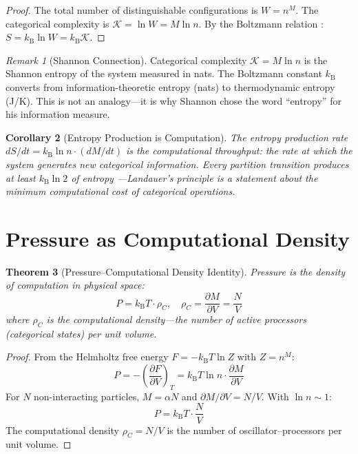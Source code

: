 \documentclass[twocolumn,10pt,a4paper]{article}
\theoremstyle{plain}
\newtheorem{theorem}{Theorem}[section]
\newtheorem{corollary}[theorem]{Corollary}
\theoremstyle{definition}
\theoremstyle{remark}
\newtheorem{remark}[theorem]{Remark}
\newcommand{\kB}{k_{\mathrm{B}}}
\begin{document}
\begin{proof}
The total number of distinguishable configurations is $W = n^M$. The categorical complexity is $\mathcal{K} = \ln W = M \ln n$. By the Boltzmann relation \cite{boltzmann1877}: $S = \kB \ln W = \kB \mathcal{K}$.
\end{proof}

\begin{remark}[Shannon Connection]
Categorical complexity $\mathcal{K} = M \ln n$ is the Shannon entropy \cite{shannon1948} of the system measured in nats. The Boltzmann constant $\kB$ converts from information-theoretic entropy (nats) to thermodynamic entropy (J/K). This is not an analogy---it is why Shannon chose the word ``entropy'' for his information measure.
\end{remark}

\begin{corollary}[Entropy Production is Computation]
The entropy production rate $dS/dt = \kB \ln n \cdot (dM/dt)$ is the computational throughput: the rate at which the system generates new categorical information. Every partition transition produces at least $\kB \ln 2$ of entropy \cite{landauer1961}---Landauer's principle is a statement about the minimum computational cost of categorical operations.
\end{corollary}

\section{Pressure as Computational Density}
\label{sec:pressure_density}

\begin{theorem}[Pressure--Computational Density Identity]
\label{thm:pressure_density}
Pressure is the density of computation in physical space:
\begin{equation}
\boxed{P = \kB T \cdot \rho_C, \quad \rho_C = \frac{\partial M}{\partial V} = \frac{N}{V}}
\end{equation}
where $\rho_C$ is the computational density---the number of active processors (categorical states) per unit volume.
\end{theorem}

\begin{proof}
From the Helmholtz free energy $F = -\kB T \ln Z$ with $Z = n^M$:
\begin{equation}
    P = -\left(\frac{\partial F}{\partial V}\right)_T = \kB T \ln n \cdot \frac{\partial M}{\partial V}
\end{equation}
For $N$ non-interacting particles, $M = \alpha N$ and $\partial M/\partial V = N/V$. With $\ln n \sim 1$:
\begin{equation}
    P = \kB T \cdot \frac{N}{V}
\end{equation}
The computational density $\rho_C = N/V$ is the number of oscillator--processors per unit volume.
\end{proof}
\end{document}
